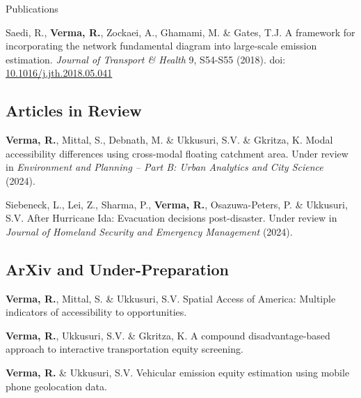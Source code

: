 \documentclass{CV} %
\begin{document}
\begin{rSection}{Publications}
\begin{etaremune}
        \item Saedi, R., \textbf{Verma, R.}, Zockaei, A., Ghamami, M. \& Gates, T.J. A framework for incorporating the network fundamental diagram into large-scale emission estimation. \textit{Journal of Transport \& Health} 9, S54-S55 (2018). doi: \href{https://www.sciencedirect.com/science/article/abs/pii/S2214140518302263}{10.1016/j.jth.2018.05.041}
    \end{etaremune}
    
    \subsection*{Articles in Review}
    \begin{etaremune}
        \item \textbf{Verma, R.}, Mittal, S., Debnath, M. \& Ukkusuri, S.V. \& Gkritza, K. Modal accessibility differences using cross-modal floating catchment area. Under review in \textit{Environment and Planning – Part B: Urban Analytics and City Science} (2024).
               
        \item Siebeneck, L., Lei, Z., Sharma, P., \textbf{Verma, R.}, Osazuwa-Peters, P. \& Ukkusuri, S.V. After Hurricane Ida: Evacuation decisions post-disaster. Under review in \textit{Journal of Homeland Security and Emergency Management} (2024).
    \end{etaremune}

    \subsection*{ArXiv and Under-Preparation}
    \begin{etaremune}
        \item \textbf{Verma, R.}, Mittal, S. \& Ukkusuri, S.V. Spatial Access of America: Multiple indicators of accessibility to opportunities.
        
        \item \textbf{Verma, R.}, Ukkusuri, S.V. \& Gkritza, K. A compound disadvantage-based approach to interactive transportation equity screening.
        
        \item \textbf{Verma, R.} \& Ukkusuri, S.V. Vehicular emission equity estimation using mobile phone geolocation data.
        
    

\end{etaremune}
\end{rSection}
\end{document}
